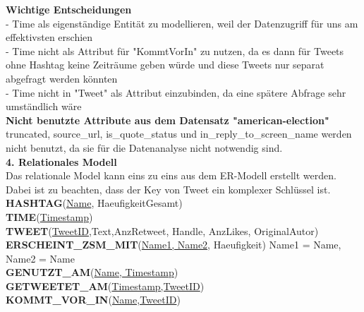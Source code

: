 \documentclass[a4paper ,8pt,x11names]{article}
\begin{document}
\begin{flushleft}
\textbf{Wichtige Entscheidungen}
\vspace{0.25cm}\\
- Time als eigenständige Entität zu modellieren, weil der Datenzugriff für uns am effektivsten erschien\\
- Time nicht als Attribut für "KommtVorIn" zu nutzen, da es dann für Tweets ohne Hashtag keine Zeiträume geben würde und diese Tweets nur separat abgefragt werden könnten\\
- Time nicht in "Tweet" als Attribut einzubinden, da eine spätere Abfrage sehr umständlich wäre
\vspace{1.0cm}\\
\textbf{Nicht benutzte Attribute aus dem Datensatz "american-election"}
\vspace{0.25cm}\\
truncated, source\_url, is\_quote\_status und in\_reply\_to\_screen\_name werden nicht benutzt, da sie für die Datenanalyse nicht notwendig sind.
\vspace{1.0cm}\\
\newpage
\textbf{4. Relationales Modell}
\vspace{0.25cm}\\
Das relationale Model kann eins zu eins aus dem ER-Modell erstellt werden.\\
Dabei ist zu beachten, dass der Key von Tweet ein komplexer Schlüssel ist.
\vspace{0.25cm}\\

\textbf{HASHTAG}(\underline{Name}, HaeufigkeitGesamt)
\vspace{0.25cm}\\
\textbf{TIME}(\underline{Timestamp})
\vspace{0.25cm}\\
\textbf{TWEET}(\underline{TweetID},Text,AnzRetweet, Handle, AnzLikes, OriginalAutor)
\vspace{0.25cm}\\
\textbf{ERSCHEINT\_ZSM\_MIT}(\underline{Name1, Name2}, Haeufigkeit) Name1 = Name, Name2 = Name
\vspace{0.25cm}\\
\textbf{GENUTZT\_AM}(\underline{Name, Timestamp})
\vspace{0.25cm}\\
\textbf{GETWEETET\_AM}(\underline{Timestamp,TweetID})
\vspace{0.25cm}\\
\textbf{KOMMT\_VOR\_IN}(\underline{Name,TweetID})
\end{flushleft}
\end{document}
